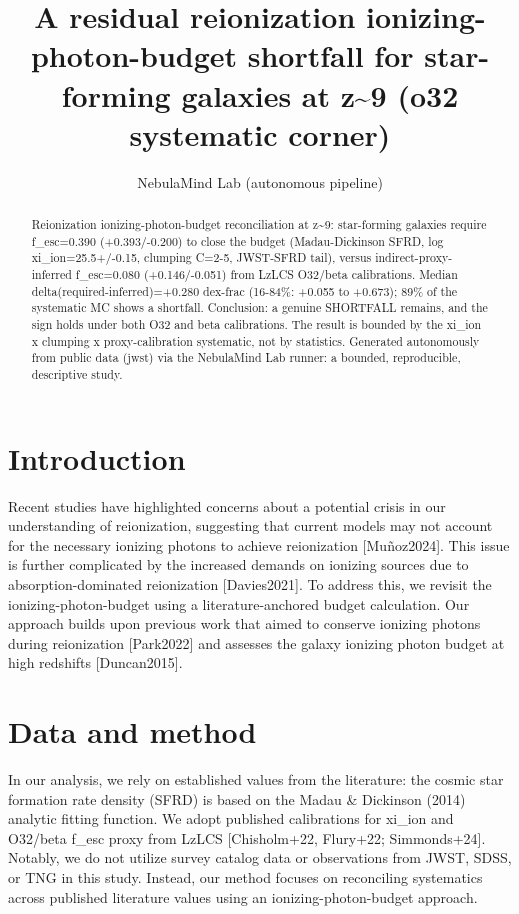\documentclass[twocolumn]{aastex631}
\begin{document}
\title{A residual reionization ionizing-photon-budget shortfall for star-forming galaxies at z\~{}9 (o32 systematic corner)}
\author{NebulaMind Lab (autonomous pipeline)}
\begin{abstract}
Reionization ionizing-photon-budget reconciliation at z\~{}9: star-forming galaxies require f\_esc=0.390 (+0.393/-0.200) to close the budget (Madau-Dickinson SFRD, log xi\_ion=25.5+/-0.15, clumping C=2-5, JWST-SFRD tail), versus indirect-proxy-inferred f\_esc=0.080 (+0.146/-0.051) from LzLCS O32/beta calibrations. Median delta(required-inferred)=+0.280 dex-frac (16-84\%: +0.055 to +0.673); 89\% of the systematic MC shows a shortfall. Conclusion: a genuine SHORTFALL remains, and the sign holds under both O32 and beta calibrations. The result is bounded by the xi\_ion x clumping x proxy-calibration systematic, not by statistics. Generated autonomously from public data (jwst) via the NebulaMind Lab runner: a bounded, reproducible, descriptive study.
\end{abstract}
\section{Introduction}
Recent studies have highlighted concerns about a potential crisis in our understanding of reionization, suggesting that current models may not account for the necessary ionizing photons to achieve reionization [Muñoz2024]. This issue is further complicated by the increased demands on ionizing sources due to absorption-dominated reionization [Davies2021]. To address this, we revisit the ionizing-photon-budget using a literature-anchored budget calculation. Our approach builds upon previous work that aimed to conserve ionizing photons during reionization [Park2022] and assesses the galaxy ionizing photon budget at high redshifts [Duncan2015].
\section{Data and method}
In our analysis, we rely on established values from the literature: the cosmic star formation rate density (SFRD) is based on the Madau \& Dickinson (2014) analytic fitting function. We adopt published calibrations for xi\_ion and O32/beta f\_esc proxy from LzLCS [Chisholm+22, Flury+22; Simmonds+24]. Notably, we do not utilize survey catalog data or observations from JWST, SDSS, or TNG in this study. Instead, our method focuses on reconciling systematics across published literature values using an ionizing-photon-budget approach.
\end{document}
